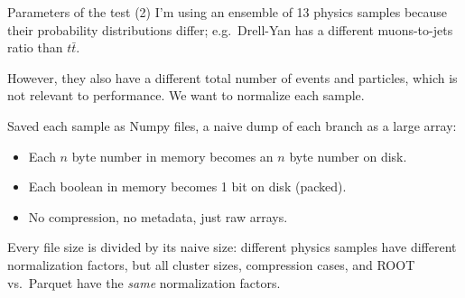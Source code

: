 \documentclass[aspectratio=169]{beamer}
\begin{document}
\begin{frame}{Parameters of the test (2)}
\vspace{0.35 cm}
I'm using an ensemble of 13 physics samples because their probability distributions differ; e.g.\ Drell-Yan has a different muons-to-jets ratio than $t\bar{t}$.

\vspace{0.5 cm}
However, they also have a different total number of events and particles, which is not relevant to performance. We want to normalize each sample.

\vspace{0.5 cm}
Saved each sample as Numpy files, a naive dump of each branch as a large array:
\begin{itemize}
\item Each $n$ byte number in memory becomes an $n$ byte number on disk.
\item Each boolean in memory becomes 1 bit on disk (packed).
\item No compression, no metadata, just raw arrays.
\end{itemize}

\vspace{0.5 cm}
Every file size is divided by its naive size: different physics samples have different normalization factors, but all cluster sizes, compression cases, and ROOT vs.\ Parquet have the {\it same} normalization factors.
\end{frame}
\end{document}
